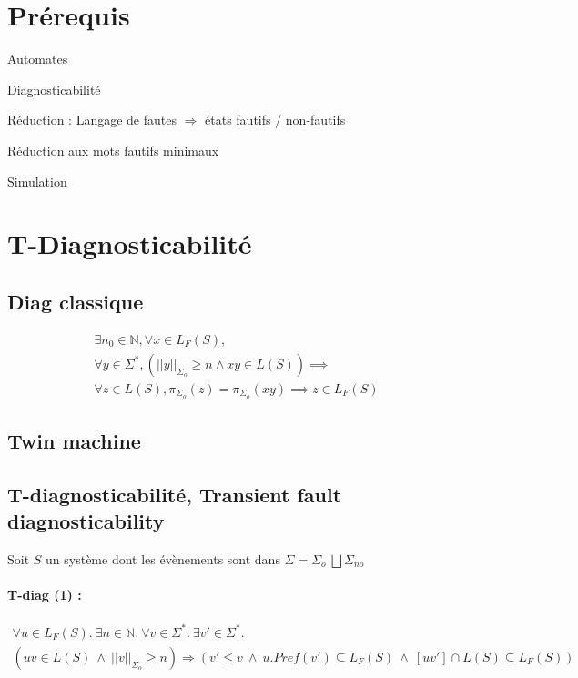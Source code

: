 \documentclass[10pt,a4paper]{article}
\begin{document}
\newpage

\section{Pr\'erequis}

Automates

Diagnosticabilit\'e

R\'eduction : Langage de fautes $\Rightarrow$ \'etats fautifs / non-fautifs

R\'eduction aux mots fautifs minimaux

Simulation

\section{T-Diagnosticabilit\'e}

\subsection{Diag classique}
$$\begin{array}{l}
\exists n_0 \in \mathbb N, \forall x \in L_F(S),\\
\forall y \in \Sigma^*, \left(||y||_{\Sigma_o} \ge n \land xy \in  L(S)\right) \implies\\
\forall z \in L(S), \pi_{\Sigma_o}(z)=\pi_{\Sigma_o}(xy) \implies z \in L_F(S)
\end{array}$$

\subsection{Twin machine}

\subsection{T-diagnosticabilit\'e, Transient fault diagnosticability}

Soit $S$ un système dont les évènements sont dans $\Sigma = \Sigma_o \ \bigsqcup \Sigma_{no}$
\paragraph{T-diag (1) :}

\begin{multline*}
\forall u \in L_F(S).\ \exists n \in \mathbb{N}.\ \forall v \in \Sigma^*.\ \exists v' \in \Sigma^*. \\
(uv \in L(S) \ \wedge \  ||v||_{\Sigma_o}\geq n) \Rightarrow (v'\leq v \ \wedge \  u.Pref(v') \subseteq L_F(S) \ \wedge \  [uv'] \cap L(S) \subseteq L_F(S))
\end{multline*}
\end{document}
